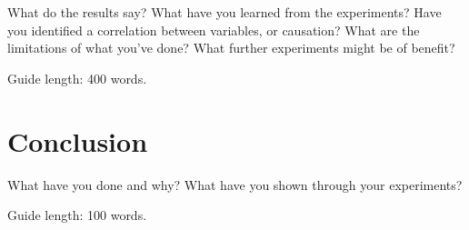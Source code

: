 \documentclass{csfourzero}
\begin{document}
What do the results say? What have you learned from the
experiments? Have you identified a correlation between variables, or
causation? What are the limitations of what you've done? What further
experiments might be of benefit?

Guide length: 400 words.

\section{Conclusion}
\label{sec:conc}

What have you done and why? What have you shown through your
experiments?

Guide length: 100 words.


\end{document}
